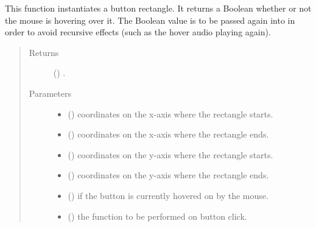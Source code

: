 \documentclass[letterpaper,10pt,english,openany,oneside]{sphinxmanual}
\begin{document}
\begin{fulllineitems}
\label{\detokenize{index:interface.add_button}}
This function instantiates a button rectangle. It returns a Boolean whether or not the mouse
is hovering over it. The Boolean value is to be passed again into  in order to
avoid recursive effects (such as the hover audio playing again).
\begin{quote}\begin{description}
\item[{Returns}] \leavevmode
() .

\item[{Parameters}] \leavevmode\begin{itemize}
\item {} 
 () \textendash{} coordinates on the x-axis where the rectangle starts.

\item {} 
 () \textendash{} coordinates on the x-axis where the rectangle ends.

\item {} 
 () \textendash{} coordinates on the y-axis where the rectangle starts.

\item {} 
 () \textendash{} coordinates on the y-axis where the rectangle ends.

\item {} 
 () \textendash{} if the button is currently hovered on by the mouse.

\item {} 
 () \textendash{} the function to be performed on button click.


\end{itemize}
\end{description}
\end{quote}
\end{fulllineitems}
\end{document}
